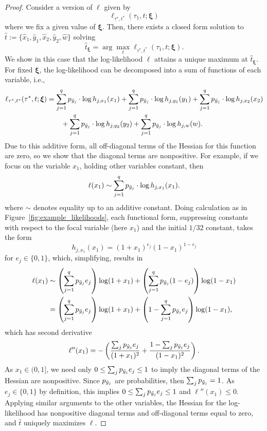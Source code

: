 \begin{proof}
Consider a version of $\ell$ given by
\[
\ell_{\tau^*, t^*}(\tau_1, t; \boldsymbol\xi)
\]
where we fix a given value of $\boldsymbol\xi$.
Then, there exists a closed form solution to $\hat{t} := \{\hat{x}_1,\hat{y}_1,\hat{x}_2,\hat{y}_2,\hat{w}\}$ solving
\[
\hat{t}_{\boldsymbol\xi} = \arg\max_t \ell_{\tau^*, t^*}(\tau_1, t; \boldsymbol\xi).
\]
We show in this case that the log-likelihood $\ell$ attains a unique maximum at $\hat{t}_{\boldsymbol\xi}$.
For fixed $\boldsymbol\xi$, the log-likelihood can be decomposed into a sum of functions of each variable, i.e.,
\begin{align*}
\ell_{\tau^*,t^*}(\tau^*, t; \boldsymbol\xi) &= \sum_{j=1}^q p_{\tilde{y}_j}\cdot\log h_{j,x_1}(x_1)+\sum_{j=1}^q p_{\tilde{y}_j}\cdot\log h_{j,y_1}(y_1)+\sum_{j=1}^q p_{\tilde{y}_j}\cdot\log h_{j,x_2}(x_2)\\
&\qquad + \sum_{j=1}^q p_{\tilde{y}_j}\cdot\log h_{j,y_2}(y_2)+\sum_{j=1}^q p_{\tilde{y}_j}\cdot\log h_{j,w}(w).
\end{align*}
Due to this additive form, all off-diagonal terms of the Hessian for this function are zero, so we show that the diagonal terms are nonpositive.
For example, if we focus on the variable $x_1$, holding other variables constant, then
\[
\ell(x_1) \sim \sum_{j=1}^q p_{\tilde{y}_j}\cdot\log h_{j,x_1}(x_1).
\]
where $\sim$ denotes equality up to an additive constant.
Doing calculation as in Figure~\ref{fig:example_likelihoods}, each functional form, suppressing constants with respect to the focal variable (here $x_1$) and the initial $1/32$ constant, takes the form
\[
h_{j,x_1}(x_1) = (1+x_1)^{e_j}(1-x_1)^{1-e_j}
\]
for $e_j\in\{0,1\}$, which, simplifying, results in
\begin{align}
\ell(x_1) &\sim \left(\sum_{j=1}^q p_{\tilde{y}_j}e_j\right) \log(1+x_1) + \left(\sum_{j=1}^q p_{\tilde{y}_j}(1-e_j)\right) \log (1-x_1)\\
                  &= \left(\sum_{j=1}^q p_{\tilde{y}_j}e_j\right) \log(1+x_1) + \left(1-\sum_{j=1}^q p_{\tilde{y}_j}e_j\right) \log (1-x_1), \label{eq:closed-form-x}
\end{align}
which has second derivative
\[
\ell''(x_1) = -\left(\frac{\sum_j p_{\tilde{y}_j}e_j}{(1+x_1)^2}+\frac{1-\sum_j p_{\tilde{y}_j}e_j}{(1-x_1)^2}\right).
\]
As $x_1\in(0,1]$, we need only $0 \le \sum_j p_{\tilde{y}_j}e_j \le 1$ to imply the diagonal terms of the Hessian are nonpositive.
Since $p_{\tilde{y}_j}$ are probabilities, then $\sum_j p_{\tilde{y}_j} = 1$.
As $e_j\in\{0,1\}$ by definition, this implies $0 \le \sum_j p_{\tilde{y}_j}e_j \le 1$ and $\ell''(x_1) \le 0$.
Applying similar arguments to the other variables, the Hessian for the log-likelihood has nonpositive diagonal terms and off-diagonal terms equal to zero, and $\hat{t}$ uniquely maximizes $\ell$.


\end{proof}

